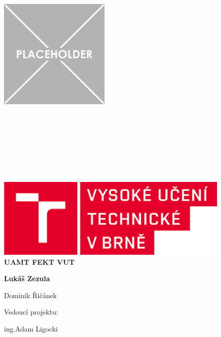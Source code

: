 \begin{titlepage}
    \begin{center}

	~\\[0.5cm]
       \includegraphics[width=0.4\textwidth]{./img/placeholder.png}\\[0cm] 

	~\\[2cm]

    \HRule \\[0.4cm]
    { \huge \bfseries \projectname}\\[0.4cm]
       \textsc{\LARGE \projectsubname}\\[0.4cm]
    \HRule \\[1cm]
    
    \textsc{\LARGE \projectdoc}\\[0.5cm]
    \texttt{\Large \gitFirstTagDescribe}\\[1.5cm]

    \begin{minipage}{0.5\textwidth}
      \begin{center} \large
        \includegraphics[width=0.85\textwidth]{./img/loga/vut.png}\\[1cm] 
		 \Large\bfseries UAMT FEKT VUT		
      \end{center}
    \end{minipage}%
    \begin{minipage}{0.5\textwidth}\raggedleft\Large\bfseries
 	Lukáš Zezula\par
        Dominik Řičánek\par
    \raggedright    
        Vedoucí projektu: \par
   \raggedleft     
        ing.Adam Ligocki
    \end{minipage}
    \vfill
   \end{center}
\end{titlepage}